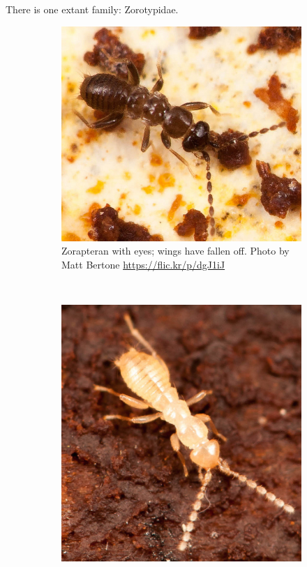 \documentclass[letterpaper, 11pt]{article}
\begin{document}
\noindent{}There is one extant family: Zorotypidae.

\begin{figure}[ht!]
    \centering
    \begin{subfigure}[ht!]{0.45\textwidth}
        \includegraphics[width=\textwidth]{zorap1}
        \caption{Zorapteran with eyes; wings have fallen off. Photo \textcopyright{} by Matt Bertone \url{https://flic.kr/p/dgJ1iJ}}
        \label{fig:zorapbrown}
    \end{subfigure}
    ~ %
    \begin{subfigure}[ht!]{0.45\textwidth}
        \includegraphics[width=\textwidth]{zorap2}

\end{subfigure}
\end{figure}
\end{document}
